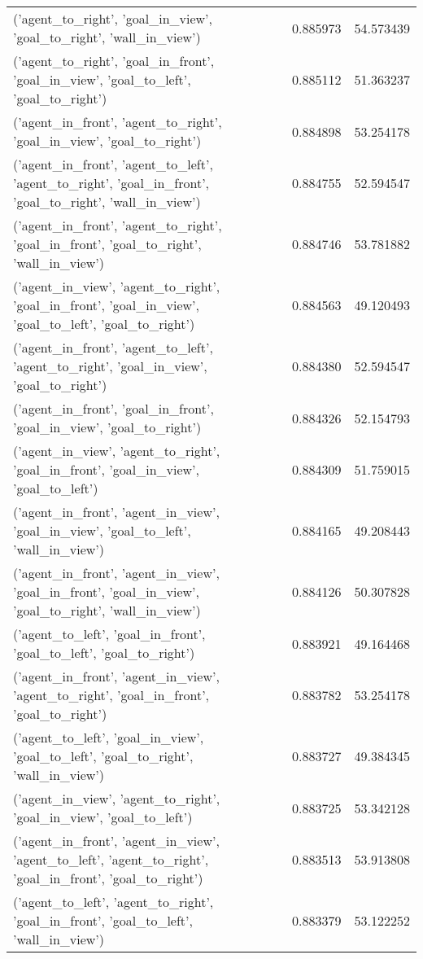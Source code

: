 \begin{tabular}{lrr}
('agent\_to\_right', 'goal\_in\_view', 'goal\_to\_right', 'wall\_in\_view') & 0.885973 & 54.573439 \\
('agent\_to\_right', 'goal\_in\_front', 'goal\_in\_view', 'goal\_to\_left', 'goal\_to\_right') & 0.885112 & 51.363237 \\
('agent\_in\_front', 'agent\_to\_right', 'goal\_in\_view', 'goal\_to\_right') & 0.884898 & 53.254178 \\
('agent\_in\_front', 'agent\_to\_left', 'agent\_to\_right', 'goal\_in\_front', 'goal\_to\_right', 'wall\_in\_view') & 0.884755 & 52.594547 \\
('agent\_in\_front', 'agent\_to\_right', 'goal\_in\_front', 'goal\_to\_right', 'wall\_in\_view') & 0.884746 & 53.781882 \\
('agent\_in\_view', 'agent\_to\_right', 'goal\_in\_front', 'goal\_in\_view', 'goal\_to\_left', 'goal\_to\_right') & 0.884563 & 49.120493 \\
('agent\_in\_front', 'agent\_to\_left', 'agent\_to\_right', 'goal\_in\_view', 'goal\_to\_right') & 0.884380 & 52.594547 \\
('agent\_in\_front', 'goal\_in\_front', 'goal\_in\_view', 'goal\_to\_right') & 0.884326 & 52.154793 \\
('agent\_in\_view', 'agent\_to\_right', 'goal\_in\_front', 'goal\_in\_view', 'goal\_to\_left') & 0.884309 & 51.759015 \\
('agent\_in\_front', 'agent\_in\_view', 'goal\_in\_view', 'goal\_to\_left', 'wall\_in\_view') & 0.884165 & 49.208443 \\
('agent\_in\_front', 'agent\_in\_view', 'goal\_in\_front', 'goal\_in\_view', 'goal\_to\_right', 'wall\_in\_view') & 0.884126 & 50.307828 \\
('agent\_to\_left', 'goal\_in\_front', 'goal\_to\_left', 'goal\_to\_right') & 0.883921 & 49.164468 \\
('agent\_in\_front', 'agent\_in\_view', 'agent\_to\_right', 'goal\_in\_front', 'goal\_to\_right') & 0.883782 & 53.254178 \\
('agent\_to\_left', 'goal\_in\_view', 'goal\_to\_left', 'goal\_to\_right', 'wall\_in\_view') & 0.883727 & 49.384345 \\
('agent\_in\_view', 'agent\_to\_right', 'goal\_in\_view', 'goal\_to\_left') & 0.883725 & 53.342128 \\
('agent\_in\_front', 'agent\_in\_view', 'agent\_to\_left', 'agent\_to\_right', 'goal\_in\_front', 'goal\_to\_right') & 0.883513 & 53.913808 \\
('agent\_to\_left', 'agent\_to\_right', 'goal\_in\_front', 'goal\_to\_left', 'wall\_in\_view') & 0.883379 & 53.122252 \\

\end{tabular}

